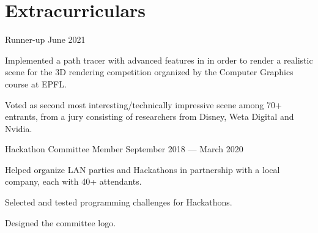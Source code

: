 \section*{Extracurriculars}

\begin{cventries}
  {Runner-up}
  {June 2021}
  {}
  {%
    \begin{cvitems}
    \item Implemented a path tracer with advanced features in  in order to render a realistic scene for the 3D rendering competition organized by the Computer Graphics course at EPFL\@.
      \item Voted as second most interesting/technically impressive scene among 70+ entrants, from a jury consisting of researchers from Disney, Weta Digital and Nvidia.
    \end{cvitems}
  }
  {Hackathon Committee Member}
  {September 2018 --- March 2020}
  {}
  {%
    \begin{cvitems}
      \item Helped organize LAN parties and Hackathons in partnership with a local company, each with 40+ attendants.
      \item Selected and tested programming challenges for Hackathons.
      \item Designed the committee logo.
    \end{cvitems}
  }
\end{cventries}

